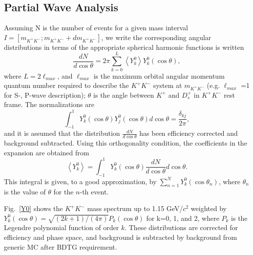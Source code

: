 \subsection{Partial Wave Analysis}
\par{Assuming N is the number of events for a given mass interval $I=[m_{K^{+}K^{-}}; m_{K^{+}K^{-}} + dm_{K^{+}K^{-}}]$, we write the corresponding angular distributions in terms of the appropriate spherical harmonic functions is written
    \begin{equation}
        \frac{dN}{d\cos\theta} = 2\pi\sum_{k=0}^L\left\langle Y_{k}^{0}\right\rangle Y_{k}^{0}(\cos\theta),\label{expansion}
    \end{equation}
    where $L = 2 \ell_{max}$, and $\ell_{max}$ is the maximum orbital angular momentum quantum number required to describe the $K^{+}K^{-}$ system at $m_{K^{+}K^{-}}$ (e.g. $\ell_{max}$ =1 for S-, P-wave description); $\theta$ is the angle between $K^{+}$ and $D_{s}^{+}$ in $K^{+}K^{-}$ rest frame. 
    The normalizations are 
    \begin{equation}
        \int_{-1}^{1}Y_{k}^{0}(\cos\theta)Y_{j}^{0}(\cos\theta) d\cos\theta  = \frac{\delta_{kj}}{2\pi},\label{sh-normalizations}
    \end{equation}
    and it is  assumed that the distribution $\frac{dN}{d\cos\theta}$ has been efficiency corrected and background subtracted.
    Using this orthogonality condition, the coefficients in the expansion are obtained from 
    \begin{equation}
        \left\langle Y_{k}^{0} \right\rangle = \int_{-1}^{1}Y_{k}^{0}(\cos\theta) \frac{dN}{d\cos\theta} d\cos\theta. \label{expansion-coefficiencies}
    \end{equation}
    This integral is given, to a good approximation, by $\sum_{n=1}^{N}Y_{k}^{0}(\cos\theta_{n})$, where $\theta_{n}$ is the value of $\theta$ for the $n$-th event.
    
    Fig.~\ref{Y0} shows the $K^{+}K^{-}$ mass spectrum up to 1.15 GeV/$c^{2}$ weighted by $Y_{k}^{0}(\cos\theta) = \sqrt{(2k+1)/(4\pi)}P_{k}(\cos\theta)$ for k=0, 1, and 2, where $P_{k}$ is the Legendre polynomial function of order $k$. These distributions are corrected for efficiency and phase space, and background is subtracted by background from generic MC after BDTG requirement.
    
}

